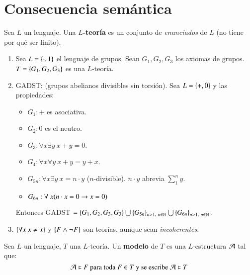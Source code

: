 
\chapter{Consecuencia semántica}

\begin{dfn}[$L$-teoría]
    Sea $L$ un lenguaje. Una \textbf{$L$-teoría} es un conjunto de \textit{enunciados} de $L$ (no tiene por qué ser finito).
\end{dfn}

\begin{eg}
    \begin{enumerate}
        \item Sea $L = \left\{\cdot, 1\right\}$ el lenguaje de grupos. Sean $G_1, G_2, G_3$ los axiomas de grupos. $T = \left\{G_1, G_2, G_3\right\}$ es una $L$-teoría.
        \item GADST: (grupos abelianos divisibles sin torsión). Sea $L = \left\{+, 0\right\}$ y las propiedades:
            \begin{itemize}
                \item $G_1: +$ es asociativa.
                \item $G_2: 0$ es el neutro.
                \item $G_3: \forall x \exists y\ x+y = 0$.
                \item $G_4: \forall x \forall y\ x+y=y+x$.
                \item $G_{5n}: \forall x \exists y\ x = n \cdot y$ ($n$-divisible). $n \cdot y$ abrevia $\sum_1^n y$.
                \item $G_{6n}: \forall\ x (n\cdot x = 0 \rightarrow x = 0)$
            \end{itemize}
            Entonces GADST $= \sdf{G_1, G_2, G_3, G_3} \bigcup \sdf{G_{5n}}_{n>1,\ n \in \N} \bigcup \sdf{G_{6n}}_{n>1,\ n \in \N}$.
        \item $\left\{\forall x\ x \neq x\right\}$ y $\left\{F \land \neg F\right\}$ son teorías, aunque sean \textit{incoherentes}.
    \end{enumerate}
\end{eg}

\begin{dfn}[Modelo]
    Sea $L$ un lenguaje, $T$ una $L$-teoría. Un \textbf{modelo} de $T$ es una $L$-estructura $\mathcal{A}$ tal que:
    $$
        \mathcal{A} \vDash F \text{ para toda } F \in T \text{ y se escribe } \mathcal{A} \vDash T
    $$
\end{dfn}

